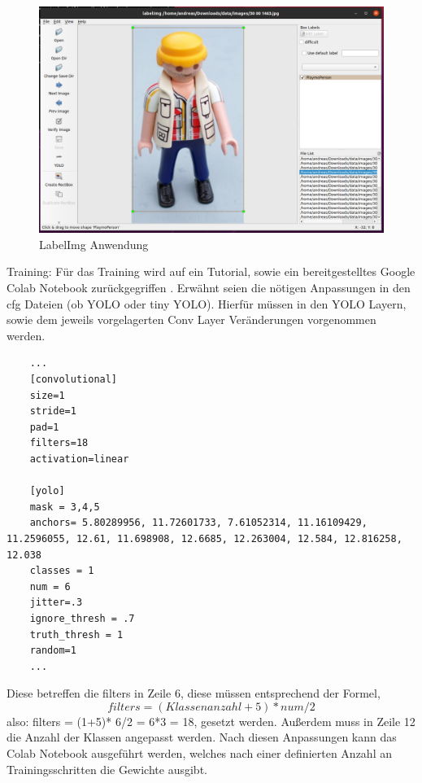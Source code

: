 \begin{enumerate}
    \begin{figure}[H]
    \centering
    \includegraphics[scale=0.2]{./img/label.PNG}
    \caption{LabelImg Anwendung}
    \label{fig:label}
    \end{figure}
    
    \end{enumerate}
    \item Training:
    Für das Training wird auf ein Tutorial, sowie ein bereitgestelltes Google Colab Notebook zurückgegriffen \cite{Rafi.2019}. Erwähnt seien die nötigen Anpassungen in den cfg Dateien (ob \ac{YOLO} oder tiny \ac{YOLO}). Hierfür müssen in den YOLO Layern, sowie dem jeweils vorgelagerten Conv Layer Veränderungen vorgenommen werden.
    \begin{lstlisting}
    ...
    [convolutional]
    size=1
    stride=1
    pad=1
    filters=18
    activation=linear
    
    [yolo]
    mask = 3,4,5
    anchors= 5.80289956, 11.72601733, 7.61052314, 11.16109429, 11.2596055, 12.61, 11.698908, 12.6685, 12.263004, 12.584, 12.816258, 12.038
    classes = 1
    num = 6
    jitter=.3
    ignore_thresh = .7
    truth_thresh = 1
    random=1
    ...
    \end{lstlisting}
    Diese betreffen die filters in Zeile 6, diese müssen entsprechend der Formel,
    \begin{equation}
        filters = (Klassenanzahl+5) * num / 2
    \end{equation}
    also: filters = (1+5)* 6/2 = 6*3 = 18, gesetzt werden.
    Außerdem muss in Zeile 12 die Anzahl der Klassen angepasst werden.
    Nach diesen Anpassungen kann das Colab Notebook ausgeführt werden, welches nach einer definierten Anzahl an Trainingsschritten die Gewichte ausgibt.

